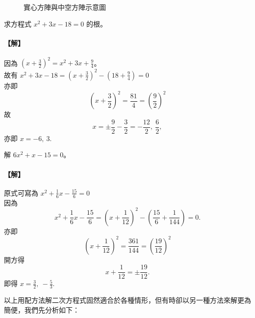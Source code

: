 \begin{figure}[htbp]
\centering
{}
\caption{實心方陣與中空方陣示意圖}
\label{fig:soldier_formation}
\end{figure}

\begin{example}\label{ex:b2_1-1-7}
求方程式 $x^2+3x-18=0$ 的根。
\end{example}
\paragraph{【解】}
因為 $(x+\frac{3}{2})^2 = x^2+3x+\frac{9}{4}$。\\
故有 $x^2+3x-18 = (x+\frac{3}{2})^2 - (18+\frac{9}{4}) = 0$\\
亦即
\[
\left(x+\frac{3}{2}\right)^2 = \frac{81}{4} = \left(\frac{9}{2}\right)^2
\]
故
\[
x = \pm \frac{9}{2} - \frac{3}{2} = -\frac{12}{2},\ \frac{6}{2},
\]
亦即 $x = -6,\ 3.$


\begin{example}\label{ex:b2_1-1-8}
解 $6x^2+x-15=0$。
\end{example}
\paragraph{【解】}
原式可寫為 $x^2+\frac{1}{6}x-\frac{15}{6}=0$\\
因為
\[
x^2+\frac{1}{6}x-\frac{15}{6} = \left(x+\frac{1}{12}\right)^2 - \left(\frac{15}{6}+\frac{1}{144}\right) = 0.
\]
亦即
\[
\left(x+\frac{1}{12}\right)^2 = \frac{361}{144} = \left(\frac{19}{12}\right)^2
\]
開方得
\[
x+\frac{1}{12} = \pm \frac{19}{12}.
\]
即得 $x = \frac{3}{2},\ -\frac{5}{3}.$


以上用配方法解二次方程式固然適合於各種情形，但有時卻以另一種方法來解更為簡便，我們先分析如下：

